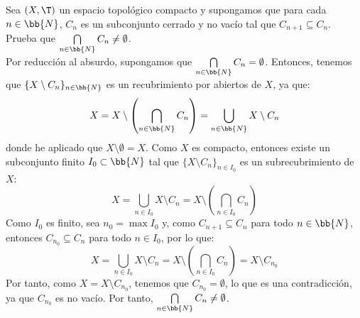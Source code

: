 \begin{ejercicio}\label{ej:4.3.19}
    Sea $(X, \T)$ un espacio topológico compacto y supongamos que para cada $n \in \bb{N}$,
    $C_n$ es un subconjunto cerrado y no vacío tal que $C_{n+1} \subseteq C_n$. Prueba que $\bigcap\limits_{n\in \bb{N}} C_n \neq \emptyset$.\\

    Por reducción al absurdo, supongamos que $\bigcap\limits_{n\in \bb{N}} C_n = \emptyset$. Entonces, tenemos que $\{X\setminus C_n\}_{n\in \bb{N}}$ es un recubrimiento por abiertos de $X$, ya que:
    \begin{equation*}
        X = X\setminus \left(\bigcap\limits_{n\in \bb{N}} C_n\right) = \bigcup_{n\in \bb{N}} X\setminus C_n
    \end{equation*}
    donde he aplicado que $X\setminus \emptyset = X$. Como $X$ es compacto, entonces existe un subconjunto finito $I_0\subset \bb{N}$ tal que $\{X\setminus C_n\}_{n\in I_0}$ es un subrecubrimiento de $X$:
    \begin{equation*}
        X = \bigcup_{n\in I_0} X\setminus C_n = X\setminus \left(\bigcap_{n\in I_0} C_n\right)
    \end{equation*}
    Como $I_0$ es finito, sea $n_0=\max I_0$ y, como $C_{n+1}\subseteq C_n$ para todo $n\in \bb{N}$, entonces $C_{n_0} \subseteq C_n$ para todo $n\in I_0$, por lo que:
    \begin{equation*}
        X = \bigcup_{n\in I_0} X\setminus C_n = X\setminus \left(\bigcap_{n\in I_0} C_n\right) = X\setminus C_{n_0}
    \end{equation*}
    Por tanto, como $X=X\setminus C_{n_0}$, tenemos que $C_{n_0}=\emptyset$, lo que es una contradicción, ya que $C_{n_0}$ es no vacío. Por tanto, $\bigcap\limits_{n\in \bb{N}} C_n \neq \emptyset$.
\end{ejercicio}

